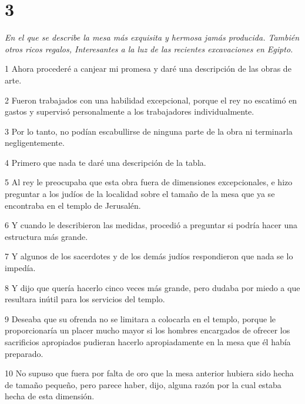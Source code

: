 \chapter{3}

\par \textit{En el que se describe la mesa más exquisita y hermosa jamás producida. También otros ricos regalos, Interesantes a la luz de las recientes excavaciones en Egipto.}

\par 1 Ahora procederé a canjear mi promesa y daré una descripción de las obras de arte.

\par 2 Fueron trabajados con una habilidad excepcional, porque el rey no escatimó en gastos y supervisó personalmente a los trabajadores individualmente.

\par 3 Por lo tanto, no podían escabullirse de ninguna parte de la obra ni terminarla negligentemente.

\par 4 Primero que nada te daré una descripción de la tabla.

\par 5 Al rey le preocupaba que esta obra fuera de dimensiones excepcionales, e hizo preguntar a los judíos de la localidad sobre el tamaño de la mesa que ya se encontraba en el templo de Jerusalén.

\par 6 Y cuando le describieron las medidas, procedió a preguntar si podría hacer una estructura más grande.

\par 7 Y algunos de los sacerdotes y de los demás judíos respondieron que nada se lo impedía.

\par 8 Y dijo que quería hacerlo cinco veces más grande, pero dudaba por miedo a que resultara inútil para los servicios del templo.

\par 9 Deseaba que su ofrenda no se limitara a colocarla en el templo, porque le proporcionaría un placer mucho mayor si los hombres encargados de ofrecer los sacrificios apropiados pudieran hacerlo apropiadamente en la mesa que él había preparado.

\par 10 No supuso que fuera por falta de oro que la mesa anterior hubiera sido hecha de tamaño pequeño, pero parece haber, dijo, alguna razón por la cual estaba hecha de esta dimensión.

